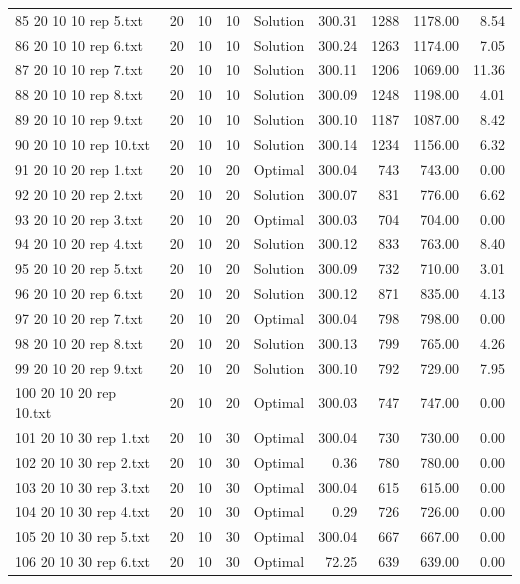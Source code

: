 \begin{longtable}{lrrllrrrr}
85 20 10 10 rep 5.txt & 20 & 10 & 10 & Solution & 300.31 & 1288 & 1178.00 &  8.54\\
86 20 10 10 rep 6.txt & 20 & 10 & 10 & Solution & 300.24 & 1263 & 1174.00 &  7.05\\
87 20 10 10 rep 7.txt & 20 & 10 & 10 & Solution & 300.11 & 1206 & 1069.00 & 11.36\\
88 20 10 10 rep 8.txt & 20 & 10 & 10 & Solution & 300.09 & 1248 & 1198.00 &  4.01\\
89 20 10 10 rep 9.txt & 20 & 10 & 10 & Solution & 300.10 & 1187 & 1087.00 &  8.42\\
90 20 10 10 rep 10.txt & 20 & 10 & 10 & Solution & 300.14 & 1234 & 1156.00 &  6.32\\
91 20 10 20 rep 1.txt & 20 & 10 & 20 & Optimal & 300.04 & 743 & 743.00 &  0.00\\
92 20 10 20 rep 2.txt & 20 & 10 & 20 & Solution & 300.07 & 831 & 776.00 &  6.62\\
93 20 10 20 rep 3.txt & 20 & 10 & 20 & Optimal & 300.03 & 704 & 704.00 &  0.00\\
94 20 10 20 rep 4.txt & 20 & 10 & 20 & Solution & 300.12 & 833 & 763.00 &  8.40\\
95 20 10 20 rep 5.txt & 20 & 10 & 20 & Solution & 300.09 & 732 & 710.00 &  3.01\\
96 20 10 20 rep 6.txt & 20 & 10 & 20 & Solution & 300.12 & 871 & 835.00 &  4.13\\
97 20 10 20 rep 7.txt & 20 & 10 & 20 & Optimal & 300.04 & 798 & 798.00 &  0.00\\
98 20 10 20 rep 8.txt & 20 & 10 & 20 & Solution & 300.13 & 799 & 765.00 &  4.26\\
99 20 10 20 rep 9.txt & 20 & 10 & 20 & Solution & 300.10 & 792 & 729.00 &  7.95\\
100 20 10 20 rep 10.txt & 20 & 10 & 20 & Optimal & 300.03 & 747 & 747.00 &  0.00\\
101 20 10 30 rep 1.txt & 20 & 10 & 30 & Optimal & 300.04 & 730 & 730.00 &  0.00\\
102 20 10 30 rep 2.txt & 20 & 10 & 30 & Optimal &  0.36 & 780 & 780.00 &  0.00\\
103 20 10 30 rep 3.txt & 20 & 10 & 30 & Optimal & 300.04 & 615 & 615.00 &  0.00\\
104 20 10 30 rep 4.txt & 20 & 10 & 30 & Optimal &  0.29 & 726 & 726.00 &  0.00\\
105 20 10 30 rep 5.txt & 20 & 10 & 30 & Optimal & 300.04 & 667 & 667.00 &  0.00\\
106 20 10 30 rep 6.txt & 20 & 10 & 30 & Optimal & 72.25 & 639 & 639.00 &  0.00\\

\end{longtable}
